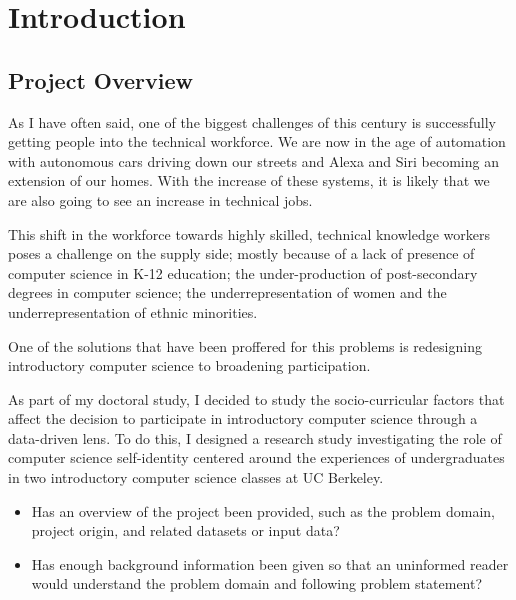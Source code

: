 \documentclass[twoside,openright,titlepage,numbers=noenddot,headinclude,%
               footinclude=true,cleardoublepage=empty,abstractoff,BCOR=5mm,%
               paper=a4,fontsize=11pt,ngerman,american]{scrreprt}
\numberwithin{theorem}{chapter}
\numberwithin{definition}{chapter}
\numberwithin{algorithm}{chapter}
\numberwithin{figure}{chapter}
\numberwithin{table}{chapter}
\numberwithin{equation}{chapter}
\begin{document}
\frenchspacing
\raggedbottom
{}
\pagestyle{plain}


%


\cleardoublepage


\chapter*{Introduction}

\section*{Project Overview}

As I have often said, one of the biggest challenges of this century is successfully getting people into the technical workforce. We are now in the age of automation with autonomous cars driving down our streets and Alexa and Siri becoming an extension of our homes. With the increase of these systems, it is likely that we are also going to see an increase in technical jobs.

This shift in the workforce towards highly skilled, technical knowledge workers poses a challenge on the supply side; mostly because of a lack of presence of computer science in K-12 education; the under-production of post-secondary degrees in computer science;  the underrepresentation of women and the underrepresentation of ethnic minorities.

One of the solutions that have been proffered for this problems is redesigning introductory computer science to broadening participation.  

As part of my doctoral study, I decided to study the socio-curricular factors that affect the decision to participate in introductory computer science through a data-driven lens. To do this, I designed a research study investigating the role of computer science self-identity centered around the experiences of undergraduates in two introductory computer science classes at UC Berkeley.

\begin{itemize}%
\item Has an overview of the project been provided, such as the problem domain, project origin, and related datasets or input data?
\item Has enough background information been given so that an uninformed reader would understand the problem domain and following problem statement?
\end{itemize}
\end{document}
